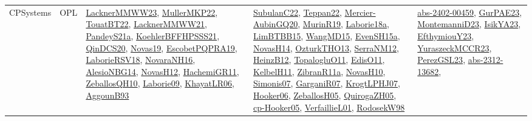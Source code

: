 {\begin{longtable}{lp{3cm}>{\raggedright}p{6cm}>{\raggedright}p{6cm}p{8cm}}
CPSystems & OPL & \href{articles/LacknerMMWW23.pdf}{LacknerMMWW23}\cite{LacknerMMWW23}, \href{articles/MullerMKP22.pdf}{MullerMKP22}\cite{MullerMKP22}, \href{papers/TouatBT22.pdf}{TouatBT22}\cite{TouatBT22}, \href{papers/LacknerMMWW21.pdf}{LacknerMMWW21}\cite{LacknerMMWW21}, \href{articles/PandeyS21a.pdf}{PandeyS21a}\cite{PandeyS21a}, \href{articles/KoehlerBFFHPSSS21.pdf}{KoehlerBFFHPSSS21}\cite{KoehlerBFFHPSSS21}, \href{articles/QinDCS20.pdf}{QinDCS20}\cite{QinDCS20}, \href{articles/Novas19.pdf}{Novas19}\cite{Novas19}, \href{articles/EscobetPQPRA19.pdf}{EscobetPQPRA19}\cite{EscobetPQPRA19}, \href{articles/LaborieRSV18.pdf}{LaborieRSV18}\cite{LaborieRSV18}, \href{articles/NovaraNH16.pdf}{NovaraNH16}\cite{NovaraNH16}, \href{papers/AlesioNBG14.pdf}{AlesioNBG14}\cite{AlesioNBG14}, \href{articles/NovasH12.pdf}{NovasH12}\cite{NovasH12}, \href{articles/HachemiGR11.pdf}{HachemiGR11}\cite{HachemiGR11}, \href{articles/ZeballosQH10.pdf}{ZeballosQH10}\cite{ZeballosQH10}, \href{papers/Laborie09.pdf}{Laborie09}\cite{Laborie09}, \href{articles/KhayatLR06.pdf}{KhayatLR06}\cite{KhayatLR06}, \href{articles/AggounB93.pdf}{AggounB93}\cite{AggounB93} & \href{articles/SubulanC22.pdf}{SubulanC22}\cite{SubulanC22}, \href{papers/Teppan22.pdf}{Teppan22}\cite{Teppan22}, \href{papers/Mercier-AubinGQ20.pdf}{Mercier-AubinGQ20}\cite{Mercier-AubinGQ20}, \href{papers/MurinR19.pdf}{MurinR19}\cite{MurinR19}, \href{papers/Laborie18a.pdf}{Laborie18a}\cite{Laborie18a}, \href{papers/LimBTBB15.pdf}{LimBTBB15}\cite{LimBTBB15}, \href{articles/WangMD15.pdf}{WangMD15}\cite{WangMD15}, \href{articles/EvenSH15a.pdf}{EvenSH15a}\cite{EvenSH15a}, \href{articles/NovasH14.pdf}{NovasH14}\cite{NovasH14}, \href{articles/OzturkTHO13.pdf}{OzturkTHO13}\cite{OzturkTHO13}, \href{papers/SerraNM12.pdf}{SerraNM12}\cite{SerraNM12}, \href{papers/HeinzB12.pdf}{HeinzB12}\cite{HeinzB12}, \href{articles/TopalogluO11.pdf}{TopalogluO11}\cite{TopalogluO11}, \href{papers/EdisO11.pdf}{EdisO11}\cite{EdisO11}, \href{articles/KelbelH11.pdf}{KelbelH11}\cite{KelbelH11}, \href{papers/ZibranR11a.pdf}{ZibranR11a}\cite{ZibranR11a}, \href{articles/NovasH10.pdf}{NovasH10}\cite{NovasH10}, \href{articles/Simonis07.pdf}{Simonis07}\cite{Simonis07}, \href{papers/GarganiR07.pdf}{GarganiR07}\cite{GarganiR07}, \href{papers/KrogtLPHJ07.pdf}{KrogtLPHJ07}\cite{KrogtLPHJ07}, \href{articles/Hooker06.pdf}{Hooker06}\cite{Hooker06}, \href{articles/ZeballosH05.pdf}{ZeballosH05}\cite{ZeballosH05}, \href{papers/QuirogaZH05.pdf}{QuirogaZH05}\cite{QuirogaZH05}, \href{papers/cp-Hooker05.pdf}{cp-Hooker05}\cite{cp-Hooker05}, \href{papers/VerfaillieL01.pdf}{VerfaillieL01}\cite{VerfaillieL01}, \href{papers/RodosekW98.pdf}{RodosekW98}\cite{RodosekW98} & \href{articles/abs-2402-00459.pdf}{abs-2402-00459}\cite{abs-2402-00459}, \href{articles/GurPAE23.pdf}{GurPAE23}\cite{GurPAE23}, \href{articles/MontemanniD23.pdf}{MontemanniD23}\cite{MontemanniD23}, \href{articles/IsikYA23.pdf}{IsikYA23}\cite{IsikYA23}, \href{papers/EfthymiouY23.pdf}{EfthymiouY23}\cite{EfthymiouY23}, \href{articles/YuraszeckMCCR23.pdf}{YuraszeckMCCR23}\cite{YuraszeckMCCR23}, \href{papers/PerezGSL23.pdf}{PerezGSL23}\cite{PerezGSL23}, \href{articles/abs-2312-13682.pdf}{abs-2312-13682}\cite{abs-2312-13682}, 
\end{longtable}}
